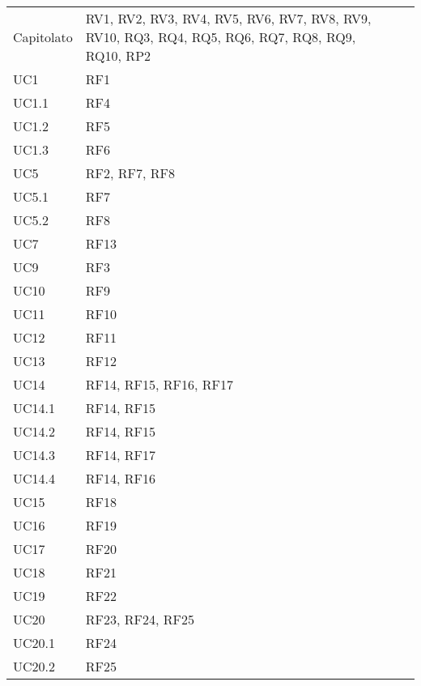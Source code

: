 {\begin{longtable}{C{.257\freewidth} C{.257\freewidth} C{.257\freewidth} C{.257\freewidth}}
      Capitolato & RV1, RV2, RV3, RV4, RV5, RV6, RV7, RV8, RV9, RV10,
                   RQ3, RQ4, RQ5, RQ6, RQ7, RQ8, RQ9, RQ10,
                   RP2\\
      UC1 & RF1\\
      UC1.1 & RF4\\
      UC1.2 & RF5\\
      UC1.3 & RF6\\
      UC5 & RF2, RF7, RF8\\
      UC5.1 & RF7\\
      UC5.2 & RF8\\
      UC7 & RF13\\
      UC9 & RF3\\
      UC10 & RF9\\
      UC11 & RF10\\
      UC12 & RF11\\
      UC13 & RF12\\
      UC14 & RF14, RF15, RF16, RF17\\
      UC14.1 & RF14, RF15\\
      UC14.2 & RF14, RF15\\
      UC14.3 & RF14, RF17\\
      UC14.4 & RF14, RF16\\
      UC15 & RF18\\
      UC16 & RF19\\
      UC17 & RF20\\
      UC18 & RF21\\
      UC19 & RF22\\
      UC20 & RF23, RF24, RF25\\
      UC20.1 & RF24\\
      UC20.2 & RF25\\		
      \bottomrule
      \end{longtable}
}

